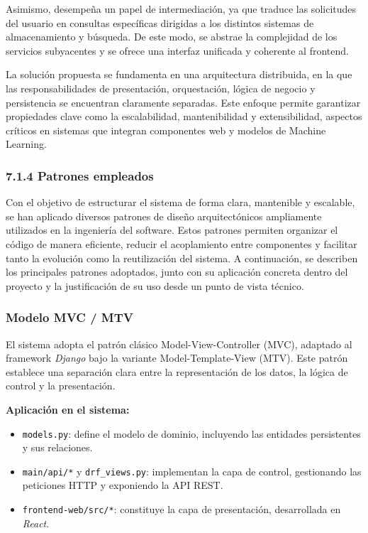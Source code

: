 Asimismo, desempeña un papel de intermediación, ya que traduce las solicitudes del usuario
en consultas específicas dirigidas a los distintos sistemas de almacenamiento y búsqueda.
De este modo, se abstrae la complejidad de los servicios subyacentes y se ofrece una interfaz unificada
y coherente al frontend.
 
La solución propuesta se fundamenta en una arquitectura distribuida, en la que
las responsabilidades de presentación, orquestación, lógica de negocio y
persistencia se encuentran claramente separadas. Este enfoque permite garantizar
propiedades clave como la escalabilidad, mantenibilidad y extensibilidad,
aspectos críticos en sistemas que integran componentes web y modelos de Machine
Learning.
 
\subsubsection{7.1.4 Patrones empleados}
Con el objetivo de estructurar el sistema de forma clara, mantenible y
escalable, se han aplicado diversos patrones de diseño arquitectónicos
ampliamente utilizados en la ingeniería del software. Estos patrones permiten
organizar el código de manera eficiente, reducir el acoplamiento entre
componentes y facilitar tanto la evolución como la reutilización del sistema.
A continuación, se describen los principales patrones adoptados, junto con su
aplicación concreta dentro del proyecto y la justificación de su uso desde un
punto de vista técnico.
 
\subsubsection{Modelo MVC / MTV}
 
El sistema adopta el patrón clásico Model-View-Controller (MVC), adaptado al
framework \textit{Django} bajo la variante Model-Template-View (MTV). Este patrón
establece una separación clara entre la representación de los datos, la lógica
de control y la presentación.
 
\textbf{Aplicación en el sistema:}
\begin{itemize}
\item \texttt{models.py}: define el modelo de dominio, incluyendo las entidades
persistentes y sus relaciones.
\item \texttt{main/api/*} y \texttt{drf\_views.py}: implementan la capa de
control, gestionando las peticiones HTTP y exponiendo la API REST.
\item \texttt{frontend-web/src/*}: constituye la capa de presentación,
desarrollada en \textit{React}.
\end{itemize}
 
